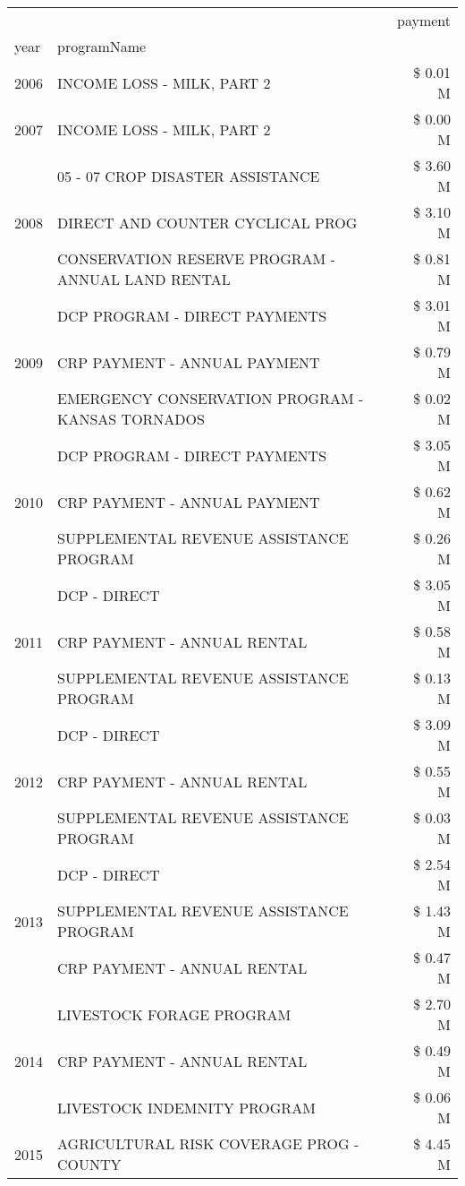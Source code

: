\begin{tabular}{llr}
\toprule
 &  & payment \\
year & programName &  \\
\midrule
2006 & INCOME LOSS - MILK, PART 2 & \$ 0.01 M \\
\cline{1-3}
2007 & INCOME LOSS - MILK, PART 2 & \$ 0.00 M \\
\cline{1-3}
\multirow[t]{3}{*}{2008} & 05 - 07 CROP DISASTER ASSISTANCE & \$ 3.60 M \\
 & DIRECT AND COUNTER CYCLICAL PROG & \$ 3.10 M \\
 & CONSERVATION RESERVE PROGRAM - ANNUAL LAND RENTAL & \$ 0.81 M \\
\cline{1-3}
\multirow[t]{3}{*}{2009} & DCP PROGRAM - DIRECT PAYMENTS & \$ 3.01 M \\
 & CRP PAYMENT - ANNUAL PAYMENT & \$ 0.79 M \\
 & EMERGENCY CONSERVATION PROGRAM - KANSAS TORNADOS & \$ 0.02 M \\
\cline{1-3}
\multirow[t]{3}{*}{2010} & DCP PROGRAM - DIRECT PAYMENTS & \$ 3.05 M \\
 & CRP PAYMENT - ANNUAL PAYMENT & \$ 0.62 M \\
 & SUPPLEMENTAL REVENUE ASSISTANCE PROGRAM & \$ 0.26 M \\
\cline{1-3}
\multirow[t]{3}{*}{2011} & DCP - DIRECT & \$ 3.05 M \\
 & CRP PAYMENT - ANNUAL RENTAL & \$ 0.58 M \\
 & SUPPLEMENTAL REVENUE ASSISTANCE PROGRAM & \$ 0.13 M \\
\cline{1-3}
\multirow[t]{3}{*}{2012} & DCP - DIRECT & \$ 3.09 M \\
 & CRP PAYMENT - ANNUAL RENTAL & \$ 0.55 M \\
 & SUPPLEMENTAL REVENUE ASSISTANCE PROGRAM & \$ 0.03 M \\
\cline{1-3}
\multirow[t]{3}{*}{2013} & DCP - DIRECT & \$ 2.54 M \\
 & SUPPLEMENTAL REVENUE ASSISTANCE PROGRAM & \$ 1.43 M \\
 & CRP PAYMENT - ANNUAL RENTAL & \$ 0.47 M \\
\cline{1-3}
\multirow[t]{3}{*}{2014} & LIVESTOCK FORAGE PROGRAM & \$ 2.70 M \\
 & CRP PAYMENT - ANNUAL RENTAL & \$ 0.49 M \\
 & LIVESTOCK INDEMNITY PROGRAM & \$ 0.06 M \\
\cline{1-3}
\multirow[t]{3}{*}{2015} & AGRICULTURAL RISK COVERAGE PROG - COUNTY & \$ 4.45 M \\

\end{tabular}
